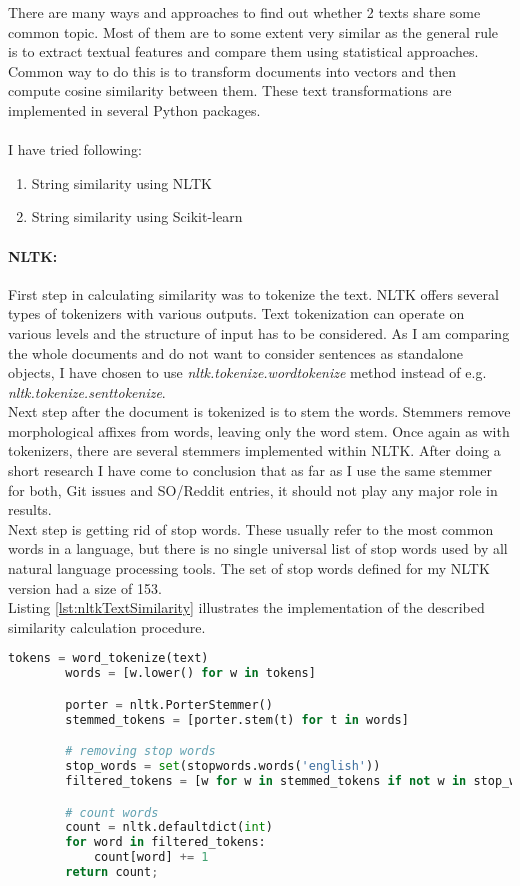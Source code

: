 There are many ways and approaches to find out whether 2 texts share some common topic. Most of them are to some extent very similar as the general rule is to extract textual features and compare them using statistical approaches. Common way to do this is to transform documents into vectors and then compute cosine similarity between them. These text transformations are implemented in several Python packages.\\
\\
I have tried following:
\begin{enumerate}
\item String similarity using NLTK
\item String similarity using Scikit-learn
\end{enumerate}

\paragraph{NLTK:}First step in calculating similarity was to tokenize the text. NLTK offers several types of tokenizers with various outputs. Text tokenization can operate on various levels and the structure of input has to be considered. As I am comparing the whole documents and do not want to consider sentences as standalone objects, I have chosen to use \textit{nltk.tokenize.wordtokenize} method instead of e.g. \textit{nltk.tokenize.senttokenize}.\\
Next step after the document is tokenized is to stem the words. Stemmers remove morphological affixes from words, leaving only the word stem. Once again as with tokenizers, there are several stemmers implemented within NLTK. After doing a short research I have come to conclusion that as far as I use the same stemmer for both, Git issues and SO/Reddit entries, it should not play any major role in results.\\
Next step is getting rid of stop words. These usually refer to the most common words in a language, but there is no single universal list of stop words used by all natural language processing tools. The set of stop words defined for my NLTK version had a size of 153.\\
Listing \ref{lst:nltkTextSimilarity} illustrates the implementation of the described similarity calculation procedure.

\begin{lstlisting}[caption={Text similarity implementation with NLTK},label={lst:nltkTextSimilarity},language=Python]
		tokens = word_tokenize(text)
		words = [w.lower() for w in tokens]

		porter = nltk.PorterStemmer()
		stemmed_tokens = [porter.stem(t) for t in words]

		# removing stop words
		stop_words = set(stopwords.words('english'))
		filtered_tokens = [w for w in stemmed_tokens if not w in stop_words]

		# count words
		count = nltk.defaultdict(int)
		for word in filtered_tokens:
			count[word] += 1
		return count;
\end{lstlisting}

